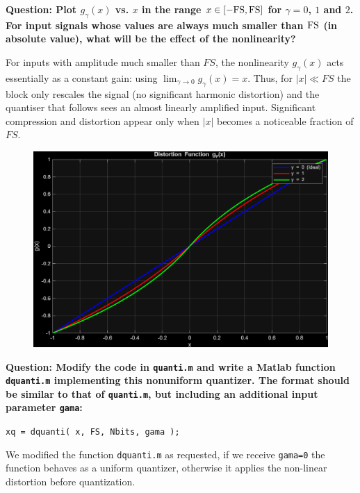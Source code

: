 \textbf{Question: Plot $g_\gamma(x)$ vs. $x$ in the range $x\in [-{\rm FS},{\rm FS}]$ for $\gamma = 0$, $1$ and $2$. For input signals whose values are always much smaller than $\rm FS$ (in absolute value), what will be the effect of the nonlinearity?
}
\vspace{0.5cm}

For inputs with amplitude much smaller than \(FS\), the nonlinearity \(g_{\gamma}(x)\) acts essentially as a constant gain: using $\lim_{\gamma \to 0} g_{\gamma}(x) = x$.
Thus, for \(|x|\ll FS\) the block only rescales the signal (no significant harmonic distortion) and the quantiser that follows sees an almost linearly amplified input. Significant compression and distortion appear only when \(|x|\) becomes a noticeable fraction of \(FS\).

\begin{figure}[H]
    \centering
    \includegraphics[width=1\textwidth]{img/task5_1.png}
    \label{fig:task5_1}
\end{figure}

\vspace{1cm}
\textbf{Question: Modify the code in {\tt quanti.m} and write a Matlab function {\tt dquanti.m} implementing this nonuniform quantizer. The format should be similar to that of {\tt quanti.m}, but including an additional input parameter {\tt gama}:}
\begin{center}
{\tt xq = dquanti( x, FS, Nbits, gama ); }
\end{center} 
\vspace{0.5cm}

We modified the function {\tt dquanti.m} as requested, if we receive \texttt{gama=0} the function behaves as a uniform quantizer, otherwise it applies the non-linear distortion before quantization.

